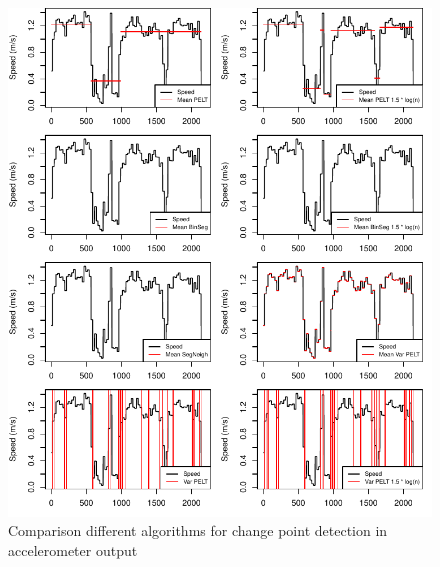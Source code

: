 \begin{figure}[ht]
\includegraphics[width=\textwidth]{img/R_comparisonMethodsSpeed2.pdf}
\centering
\caption{Comparison different algorithms for change point detection in accelerometer output\label{cpcomp}}
\end{figure} 

\clearpage

